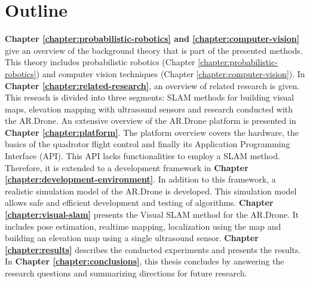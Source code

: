 	\section{Outline}
\textbf{Chapter \ref{chapter:probabilistic-robotics} and \ref{chapter:computer-vision}} give an overview of the background theory that is part of the presented methods.
This theory includes probabilistic robotics (Chapter \ref{chapter:probabilistic-robotics}) and computer vision techniques (Chapter \ref{chapter:computer-vision}).
In \textbf{Chapter \ref{chapter:related-research}}, an overview of related research is given.
This reseach is divided into three segments: SLAM methods for building visual maps, elevation mapping with ultrasound sensors and research conducted with the AR.Drone.
An extensive overview of the AR.Drone platform is presented in \textbf{Chapter \ref{chapter:platform}}.
The platform overview covers the hardware, the basics of the quadrotor flight control and finally its Application Programming Interface (API).
This API lacks functionalities to employ a SLAM method.
Therefore, it is extended to a development framework in \textbf{Chapter \ref{chapter:development-environment}}.
In addition to this framework, a realistic simulation model of the AR.Drone is developed.
This simulation model allows safe and efficient development and testing of algorithms.
\textbf{Chapter \ref{chapter:visual-slam}} presents the Visual SLAM method for the AR.Drone.
It includes pose estimation, realtime  mapping, localization using the map and building an elevation map using a single ultrasound sensor.
\textbf{Chapter \ref{chapter:results}} describes the conducted experiments and presents the results.
In \textbf{Chapter \ref{chapter:conclusions}}, this thesis concludes by answering the research questions and summarizing directions for future research.